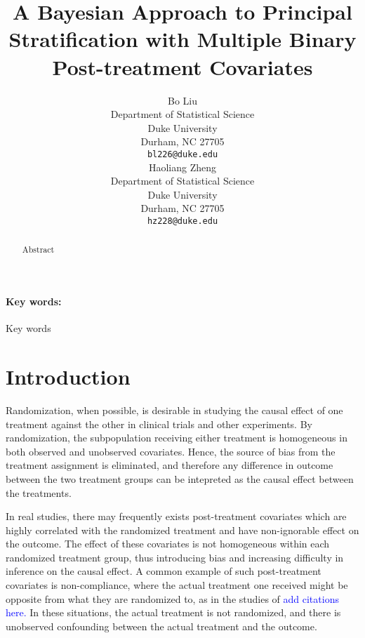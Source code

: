 \documentclass{article}
\title{A Bayesian Approach to Principal Stratification with Multiple Binary Post-treatment Covariates}
\author{%
  Bo Liu \\
  Department of Statistical Science\\
  Duke University\\
  Durham, NC 27705 \\
  \texttt{bl226@duke.edu} \\
  \And
  Haoliang Zheng \\
  Department of Statistical Science\\
  Duke University\\
  Durham, NC 27705 \\
  \texttt{hz228@duke.edu} \\
}
\begin{document}
\maketitle

\begin{abstract}
  Abstract
\end{abstract}

\paragraph{Key words:} Key words

\section{Introduction}

Randomization, when possible, is desirable in studying the causal effect of one treatment against the other in clinical trials and other experiments. By randomization, the subpopulation receiving either treatment is homogeneous in both observed and unobserved covariates. Hence, the source of bias from the treatment assignment is eliminated, and therefore any difference in outcome between the two treatment groups can be intepreted as the causal effect between the treatments. 

In real studies, there may frequently exists post-treatment covariates which are highly correlated with the randomized treatment and have non-ignorable effect on the outcome. The effect of these covariates is not homogeneous within each randomized treatment group, thus introducing bias and increasing difficulty in inference on the causal effect. A common example of such post-treatment covariates is non-compliance, where the actual treatment one received might be opposite from what they are randomized to, as in the studies of \textcolor{blue}{add citations here.} In these situations, the actual treatment is not randomized, and there is unobserved confounding between the actual treatment and the outcome.
\end{document}

